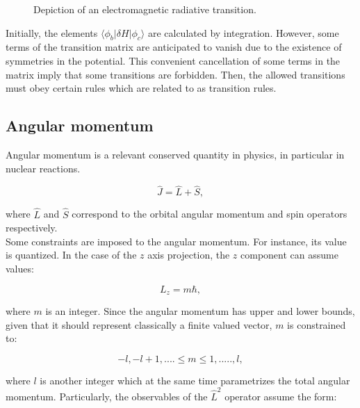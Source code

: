 \documentclass[openany]{book}
\begin{document}
\begin{figure}[H]
	
	\caption[Radiative transition illustration]{Depiction of an electromagnetic radiative transition.}
	\label{fig:radiativeEMTransition}
\end{figure}

Initially, the elements $\langle \phi_b | \delta H| \phi_c \rangle$ are calculated by integration. However, some terms of the transition matrix are anticipated to vanish due to the existence of symmetries in the potential. This convenient cancellation of some terms in the matrix imply that some transitions are forbidden. Then, the allowed transitions must obey certain rules which are related to as transition rules. \\


\subsection{Angular momentum}  \label{sub:quantumAngularMomentum}

Angular momentum is a relevant conserved quantity in physics, in particular in nuclear reactions.

\begin{equation} \label{eq:angularMomentum_definition}
	\hat J = \hat L + \hat S,
\end{equation}

where $\hat L$ and $\hat S$ correspond to the orbital angular momentum and spin operators respectively. \\

Some constraints are imposed to the angular momentum. For instance, its value is quantized. In the case of the $z$ axis projection, the $z$ component can assume values:

\begin{equation} \label{eq:angularMomentum_Lz}
	L_z = m\hbar, 
\end{equation}

where $m$ is an integer. Since the angular momentum has upper and lower bounds, given that it should represent classically a finite valued vector, $m$ is constrained to: 

\begin{equation} \label{eq:angularMomentum_mConstraint}
	-l, -l + 1, .... \leq m \leq 1, ....., l,
\end{equation}

where $l$ is another integer which at the same time parametrizes the total angular momentum. Particularly, the observables of the $\hat L^2$ operator assume the form:
\end{document}
